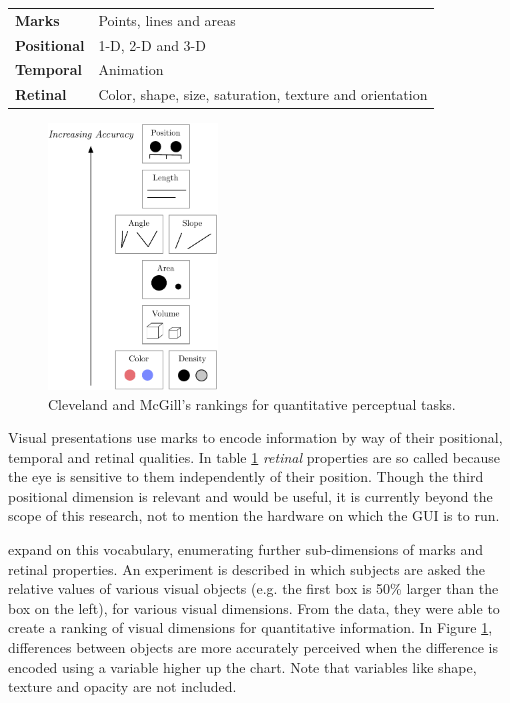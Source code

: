 \begin{table}
	\centering
	\label{tab:graphical_relationships}
		\begin{tabular}{l  l}
		\hline\hline
		\textbf{Marks}& Points, lines and areas\\
		\textbf{Positional}& 1-D, 2-D and 3-D\\
		\textbf{Temporal}& Animation\\
		\textbf{Retinal}& Color, shape, size, saturation, texture and orientation\\
		\hline
		\end{tabular}
\end{table}

\begin{figure}
	\centering
		\includegraphics[width=0.4\textwidth]{figures/accuracy_of_visual_dimensions}
		\caption{Cleveland and McGill's rankings for quantitative perceptual tasks.}
		\label{fig:accuracy_of_visual_dimensions}
\end{figure}

Visual presentations use marks to encode information by way of their positional, temporal and retinal qualities. In table \ref{tab:graphical_relationships} \emph{retinal} properties are so called because the eye is sensitive to them independently of their position. Though the third positional dimension is relevant and would be useful, it is currently beyond the scope of this research, not to mention the hardware on which the GUI is to run. 


 expand on this vocabulary, enumerating further sub-dimensions of marks and retinal properties. An experiment is described in which subjects are asked the relative values of various visual objects (e.g. the first box is 50\% larger than the box on the left), for various visual dimensions. From the data, they were able to create a ranking of visual dimensions for quantitative information. In Figure \ref{fig:accuracy_of_visual_dimensions}, differences between objects are more accurately perceived when the difference is encoded using a variable higher up the chart. Note that variables like shape, texture and opacity are not included. 


